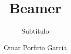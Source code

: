 




\newcommand\course{Subject}
\newcommand\Informationa{Omar Porfirio García}



\author{Omar Porfirio García}

\title{Beamer}
\subtitle{Subtítulo}